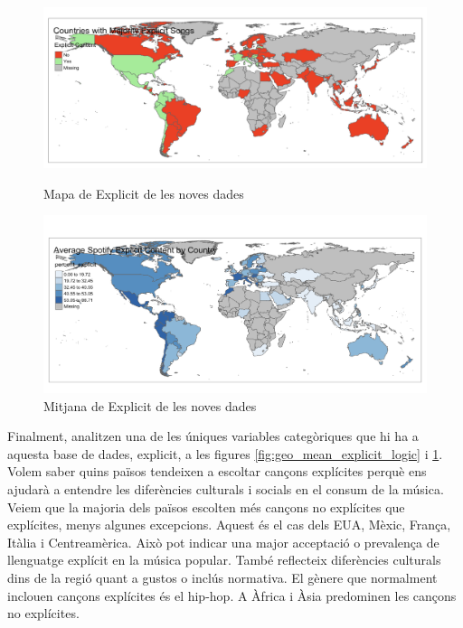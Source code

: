 \begin{figure}[H]
\centering
    \begin{minipage}{.5\textwidth}
        \centering
        \includegraphics[width=0.99\linewidth]{Images/7_Geospatial/4_data2024/data2024_explicit_logic.png}
        \caption{Mapa de Explicit de les noves dades}
        \label{fig:geo_mean_explicit_logic}
    \end{minipage}%
    \begin{minipage}{.5\textwidth}
        \centering
        \includegraphics[width=0.99\linewidth]{Images/7_Geospatial/4_data2024/data2024_explicit.png}
        \caption{Mitjana de Explicit de les noves dades}
        \label{fig:geo_mean_explicit}
    \end{minipage}%
\end{figure}

Finalment, analitzen una de les úniques variables categòriques que hi ha a aquesta base de dades, explicit, a les figures \ref{fig:geo_mean_explicit_logic} i \ref{fig:geo_mean_explicit}. Volem saber quins països tendeixen a escoltar cançons explícites perquè ens ajudarà a entendre les diferències culturals i socials en el consum de la música. Veiem que la majoria dels països escolten més cançons no explícites que explícites, menys algunes excepcions. Aquest és el cas dels EUA, Mèxic, França, Itàlia i Centreamèrica. Això pot indicar una major acceptació o prevalença de llenguatge explícit en la música popular. També reflecteix diferències culturals dins de la regió quant a gustos o inclús normativa. El gènere que normalment inclouen cançons explícites és el hip-hop. A Àfrica i Àsia predominen les cançons no explícites.


